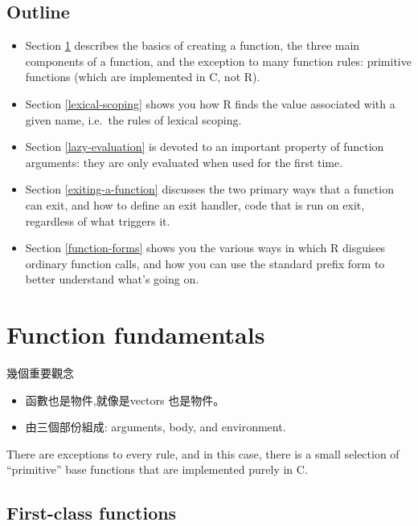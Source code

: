 \documentclass[]{book}
\theoremstyle{definition}
\theoremstyle{definition}
\theoremstyle{definition}
\theoremstyle{remark}
\begin{document}
\hypertarget{outline}{%
\subsection*{Outline}\label{outline}}

\begin{itemize}
\item
  Section \ref{function-fundamentals} describes the basics of creating a
  function, the three main components of a function, and the exception
  to many function rules: primitive functions (which are implemented in
  C, not R).
\item
  Section \ref{lexical-scoping} shows you how R finds the value
  associated with a given name, i.e.~the rules of lexical scoping.
\item
  Section \ref{lazy-evaluation} is devoted to an important property of
  function arguments: they are only evaluated when used for the first
  time.
\item
  Section \ref{exiting-a-function} discusses the two primary ways that a
  function can exit, and how to define an exit handler, code that is run
  on exit, regardless of what triggers it.
\item
  Section \ref{function-forms} shows you the various ways in which R
  disguises ordinary function calls, and how you can use the standard
  prefix form to better understand what's going on.
\end{itemize}

\hypertarget{function-fundamentals}{%
\section{Function fundamentals}\label{function-fundamentals}}

幾個重要觀念

\begin{itemize}
\item
  函數也是物件,就像是vectors 也是物件。
\item
  由三個部份組成: arguments, body, and environment.
\end{itemize}

There are exceptions to every rule, and in this case, there is a small
selection of ``primitive'' base functions that are implemented purely in
C.

\hypertarget{first-class-functions}{%
\subsection{First-class functions}\label{first-class-functions}}
\end{document}
